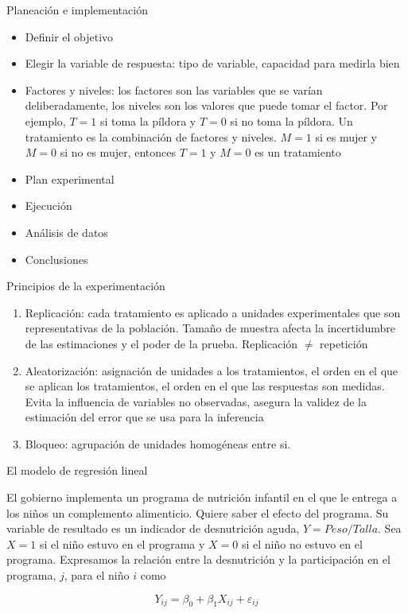 \documentclass{beamer}
\begin{document}
\begin{frame}{Planeación e implementación}

\begin{itemize}
    \item Definir el objetivo
    \item Elegir la variable de respuesta: tipo de variable, capacidad para medirla bien
    \item Factores y niveles: los factores son las variables que se varían deliberadamente, los niveles son los valores que puede tomar el factor. Por ejemplo, $T=1$ si toma la píldora y $T=0$ si no toma la píldora. Un tratamiento es la combinación de factores y niveles. $M=1$ si es mujer y $M=0$ si no es mujer, entonces $T=1$ y $M=0$ es un tratamiento
    \item Plan experimental
    \item Ejecución
    \item Análisis de datos
    \item Conclusiones
\end{itemize}
    
\end{frame}

\begin{frame}{Principios de la experimentación}

\begin{enumerate}
    \item Replicación: cada tratamiento es aplicado a unidades experimentales que son representativas de la población. Tamaño de muestra afecta la incertidumbre de las estimaciones y el poder de la prueba. Replicación $\neq$ repetición
    \item Aleatorización: asignación de unidades a los tratamientos, el orden en el que se aplican los tratamientos, el orden en el que las respuestas son medidas. Evita la influencia de variables no observadas, asegura la validez de la estimación del error que se usa para la inferencia
    \item Bloqueo: agrupación de unidades homogéneas entre si. 
    

\end{enumerate}
    
\end{frame}

\begin{frame}{El modelo de regresión lineal}


El gobierno implementa un programa de nutrición infantil en el que le entrega a los niños un complemento alimenticio. Quiere saber el efecto del programa. Su variable de resultado es un indicador de desnutrición aguda, $Y=Peso/Talla$. Sea $X=1$ si el niño estuvo en el programa y $X=0$ si el niño no estuvo en el programa. Expresamos la relación entre la desnutrición y la participación en el programa, $j$, para el niño $i$ como

\begin{equation*}
    Y_{ij}=\beta_0+\beta_1X_{ij}+\varepsilon_{ij}
\end{equation*}

    
\end{frame}
\end{document}
